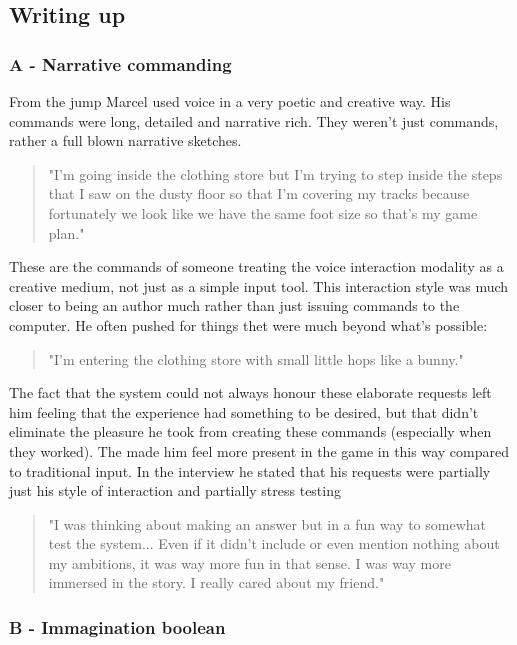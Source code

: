 \subsection{Writing up}

\subsubsection{A - Narrative commanding}

From the jump Marcel used voice in a very poetic and creative way. His commands were long, detailed and narrative rich. They weren't just commands, rather a full blown narrative sketches. 

\begin{quote}
    "I'm going inside the clothing store but I'm trying to step inside the steps that I saw on the dusty floor so that I'm covering my tracks because fortunately we look like we have the same foot size so that's my game plan."
\end{quote}

These are the commands of someone treating the voice interaction modality as a creative medium, not just as a simple input tool. 
This interaction style was much closer to being an author much rather than just issuing commands to the computer. He often pushed for things thet were much beyond what's possible:

\begin{quote}
    "I'm entering the clothing store with small little hops like a bunny."
\end{quote}

The fact that the system could not always honour these elaborate requests left him feeling that the experience had something to be desired, but that didn't eliminate the pleasure he took from creating these commands (especially when they worked). The made him feel more present in the game in this way compared to traditional input. In the interview he stated that his requests were partially just his style of interaction and partially stress testing 

\begin{quote}
    "I was thinking about making an answer but in a fun way to somewhat test the system... Even if it didn't include or even mention nothing about my ambitions, it was way more fun in that sense. I was way more immersed in the story. I really cared about my friend."
\end{quote}




\subsubsection{B - Immagination boolean}



